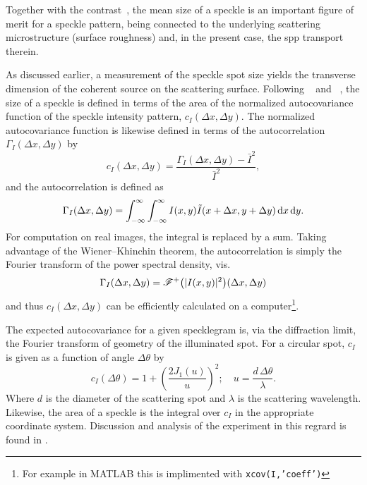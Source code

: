 Together with the contrast~\cite{goodman1975dependence}, the mean size of a
speckle is an important figure of merit for a speckle pattern, being connected
to the underlying scattering microstructure (surface roughness) and, in the
present case, the \gls{spp} transport therein.

As discussed earlier, a measurement of the speckle spot
size yields the transverse dimension of the coherent source
on the scattering surface.
Following ~\cite{goodman1975statistical} and
~\cite{dainty1975laser}, the size of a speckle is defined in
terms of the area of the normalized autocovariance function of the speckle
intensity pattern, $c_I(\Delta x, \Delta y)$.  The normalized autocovariance
function is likewise defined in terms of the autocorrelation $\Gamma_I(\Delta
  x, \Delta y)$ by
\begin{equation}
  c_I(\Delta x, \Delta y) = \frac{\Gamma_I(\Delta x, \Delta y) - \bar{I}^2}{\bar{I}^2},
  \label{eqn:normxcov}
\end{equation}
and the autocorrelation is defined as
\begin{equation}
  \Gamma_I(\Delta x, \Delta y) = \int_{-\infty}^{\infty}\int_{-\infty}^{\infty} I(x,y) \tilde{I}(x+\Delta x,y+\Delta y) \,\mathrm{d} x \,\mathrm{d} y.
\end{equation}
For computation on real images, the integral is replaced by a sum.  Taking
advantage of the Wiener–Khinchin theorem, the autocorrelation is simply the
Fourier transform of the power spectral density, vis.
\begin{equation}
  \Gamma_I(\Delta x, \Delta y) = {\mathscr{F}^{+}\bigl(|I(x,y)|^2\bigr)}(\Delta x, \Delta y)
\end{equation}
and thus  $c_I(\Delta x, \Delta y)$ can be efficiently calculated on a
computer\footnote{For example in MATLAB this is implimented with
  \texttt{xcov(I,'coeff')}}.

The expected autocovariance for a given specklegram is, via the diffraction
limit, the Fourier transform of geometry of the illuminated spot.  For a
circular spot, $c_I$ is given as a function of angle $\Delta \theta$ by
\begin{equation}
  c_I{\left(\Delta \theta\right)} = 1 + {\left(\frac{2 J_1(u)}{u}\right)}^2;\quad
  u=\frac{d\, \Delta\theta}{\lambda}.
  \label{eqn:angularsize}
\end{equation}
Where $d$ is the diameter of the scattering spot and $\lambda$ is the
scattering wavelength.  Likewise, the area of a speckle is the integral over
$c_I$ in the appropriate coordinate system.  Discussion and analysis of the
experiment in this regrard is found in .

